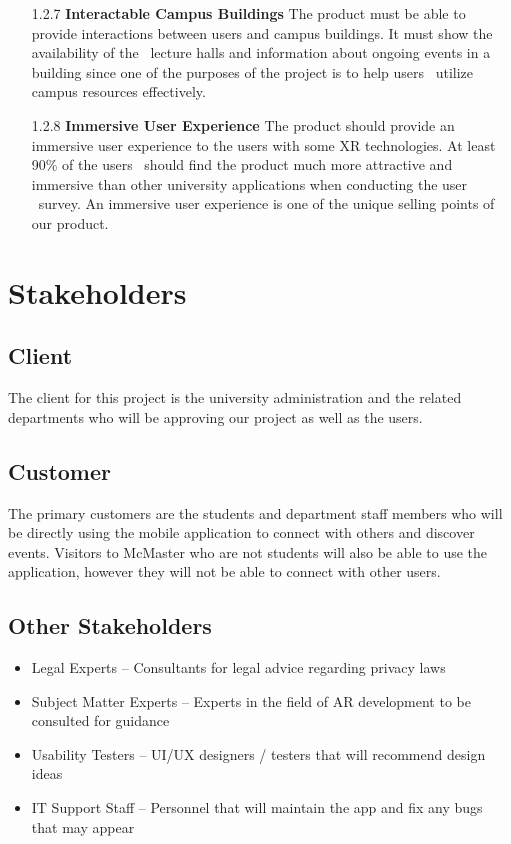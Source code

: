 \documentclass[12pt]{article}
\begin{document}
\begin{itemize}
  \item[1.2.7] \textbf{Interactable Campus Buildings}
  The product must be able to provide interactions between users and campus buildings. It must show the availability of the \
  lecture halls and information about ongoing events in a building since one of the purposes of the project is to help users \
  utilize campus resources effectively.

  \item[1.2.8] \textbf{Immersive User Experience}
  The product should provide an immersive user experience to the users with some XR technologies. At least 90\% of the users \
  should find the product much more attractive and immersive than other university applications when conducting the user \
  survey. An immersive user experience is one of the unique selling points of our product.

\end{itemize}

\section{Stakeholders}
\subsection{Client}

The client for this project is the university administration and the related departments who will be approving our project as well as the users.

\subsection{Customer}

The primary customers are the students and department staff members who will be directly using the mobile application to connect with others and discover events.
Visitors to McMaster who are not students will also be able to use the application, however they will not be able to connect with other users.

\subsection{Other Stakeholders}

\begin{itemize}
\item Legal Experts – Consultants for legal advice regarding privacy laws
\item Subject Matter Experts – Experts in the field of AR development to be consulted for guidance
\item Usability Testers – UI/UX designers / testers that will recommend design ideas
\item IT Support Staff – Personnel that will maintain the app and fix any bugs that may appear
\end{itemize}
\end{document}
